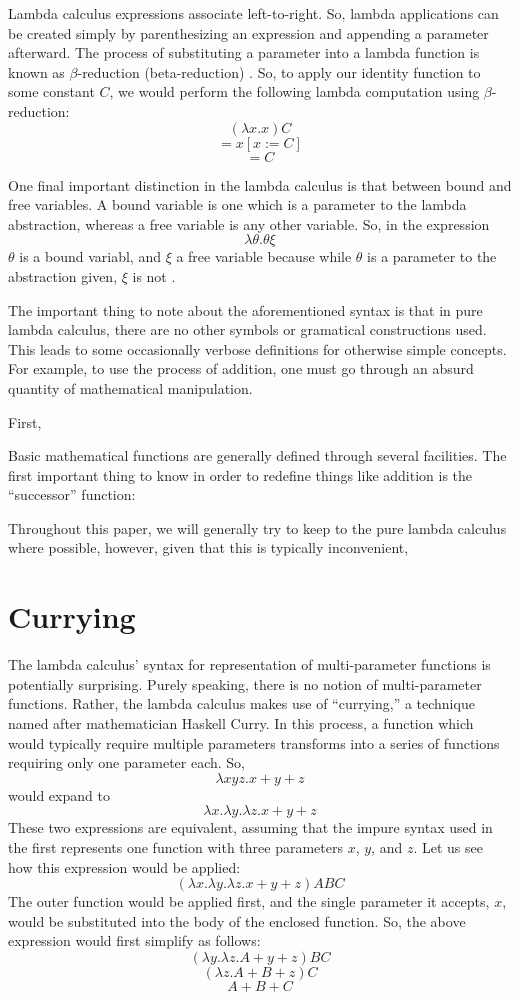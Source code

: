 \documentclass[twocolumn,titlepage,12pt]{article}
\begin{document}
Lambda calculus expressions associate left-to-right. So, lambda applications can be created simply by parenthesizing an expression and appending a parameter afterward. The process of substituting a parameter into a lambda function is known as $\beta$-reduction (beta-reduction) \cite{hudakintro}. So, to apply our identity function to some constant $C$, we would perform the following lambda computation using $\beta$-reduction:
$$(\lambda x.x)C$$
$$=x[x:=C]$$
$$=C$$

One final important distinction in the lambda calculus is that between bound and free variables. A bound variable is one which is a parameter to the lambda abstraction, whereas a free variable is any other variable. So, in the expression
$$\lambda \theta.\theta \xi$$
$\theta$ is a bound variabl, and $\xi$ a free variable because while $\theta$ is a parameter to the abstraction given, $\xi$ is not \cite{stanfordlc}.

The important thing to note about the aforementioned syntax is that in pure lambda calculus, there are no other symbols or gramatical constructions used. This leads to some occasionally verbose definitions for otherwise simple concepts. For example, to use the process of addition, one must go through an absurd quantity of mathematical manipulation.

First,



 Basic mathematical functions are generally defined through several facilities. The first important thing to know in order to redefine things like addition is the ``successor'' function:
$$$$


Throughout this paper, we will generally try to keep to the pure lambda calculus where possible, however, given that this is typically inconvenient,

\section{Currying}
The lambda calculus' syntax for representation of multi-parameter functions is potentially surprising. Purely speaking, there is no notion of multi-parameter functions. Rather, the lambda calculus makes use of ``currying,'' a technique named after mathematician Haskell Curry. In this process, a function which would typically require multiple parameters transforms into a series of functions requiring only one parameter each. So,
$$\lambda xyz.x+y+z$$
would expand to
$$\lambda x.\lambda y.\lambda z.x+y+z$$
These two expressions are equivalent, assuming that the impure syntax used in the first represents one function with three parameters $x$, $y$, and $z$. Let us see how this expression would be applied:
$$(\lambda x.\lambda y.\lambda z.x+y+z)ABC$$
The outer function would be applied first, and the single parameter it accepts, $x$, would be substituted into the body of the enclosed function. So, the above expression would first simplify as follows:
$$(\lambda y.\lambda z.A+y+z)BC$$
$$(\lambda z.A+B+z)C$$
$$A+B+C$$
\end{document}
